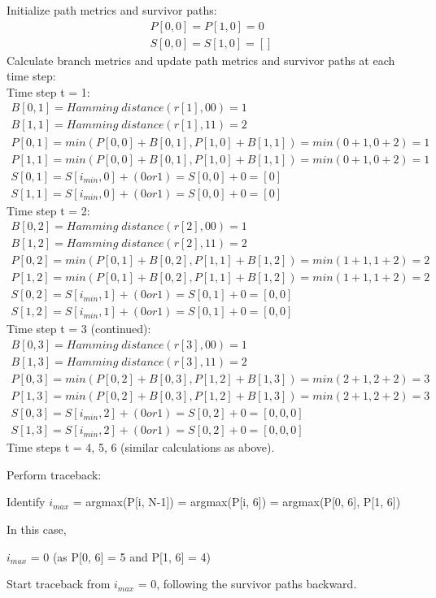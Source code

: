 \documentclass[10pt, onecolumn]{article}
\begin{document}
Initialize path metrics and survivor paths:
\begin{align}
P[0, 0] = P[1, 0] = 0\\
S[0, 0] = S[1, 0] = []
\end{align}
Calculate branch metrics and update path metrics and survivor paths at each time step:\\
Time step t = 1:
\begin{align}
B[0, 1] = Hamming\; distance(r[1], 00) = 1\\
B[1, 1] = Hamming\; distance(r[1], 11) = 2\\
P[0, 1] = min(P[0, 0] + B[0, 1], P[1, 0] + B[1, 1]) = min(0 + 1, 0 + 2) = 1\\
P[1, 1] = min(P[0, 0] + B[0, 1], P[1, 0] + B[1, 1]) = min(0 + 1, 0 + 2) = 1\\
S[0, 1] = S[i_{min}, 0] + (0 or 1) = S[0, 0] + 0 = [0]\\
S[1, 1] = S[i_{min}, 0] + (0 or 1) = S[0, 0] + 0 = [0]
\end{align}
Time step t = 2:
\begin{align}
B[0, 2] = Hamming\; distance(r[2], 00) = 1\\
B[1, 2] = Hamming\; distance(r[2], 11) = 2\\
P[0, 2] = min(P[0, 1] + B[0, 2], P[1, 1] + B[1, 2]) = min(1 + 1, 1 + 2) = 2\\
P[1, 2] = min(P[0, 1] + B[0, 2], P[1, 1] + B[1, 2]) = min(1 + 1, 1 + 2) = 2\\
S[0, 2] = S[i_{min}, 1] + (0 or 1) = S[0, 1] + 0 = [0, 0]\\
S[1, 2] = S[i_{min}, 1] + (0 or 1) = S[0, 1] + 0 = [0, 0]
\end{align}
Time step t = 3 (continued):
\begin{align}
B[0, 3] = Hamming\; distance(r[3], 00) = 1\\
B[1, 3] = Hamming\; distance(r[3], 11) = 2\\
P[0, 3] = min(P[0, 2] + B[0, 3], P[1, 2] + B[1, 3]) = min(2 + 1, 2 + 2) = 3\\
P[1, 3] = min(P[0, 2] + B[0, 3], P[1, 2] + B[1, 3]) = min(2 + 1, 2 + 2) = 3\\
S[0, 3] = S[i_{min}, 2] + (0 or 1) = S[0, 2] + 0 = [0, 0, 0]\\
S[1, 3] = S[i_{min}, 2] + (0 or 1) = S[0, 2] + 0 = [0, 0, 0]
\end{align}
Time steps t = 4, 5, 6 (similar calculations as above).

Perform traceback:
\begin{center}
Identify 
$i_{max}$ = argmax(P[i, N-1]) = argmax(P[i, 6]) = argmax(P[0, 6], P[1, 6])
\end{center}
In this case,
\begin{center}
$i_{max}$ = 0 (as P[0, 6] = 5 and P[1, 6] = 4)
\end{center}
Start traceback from $i_{max}$ = 0, following the survivor paths backward.
\end{document}
